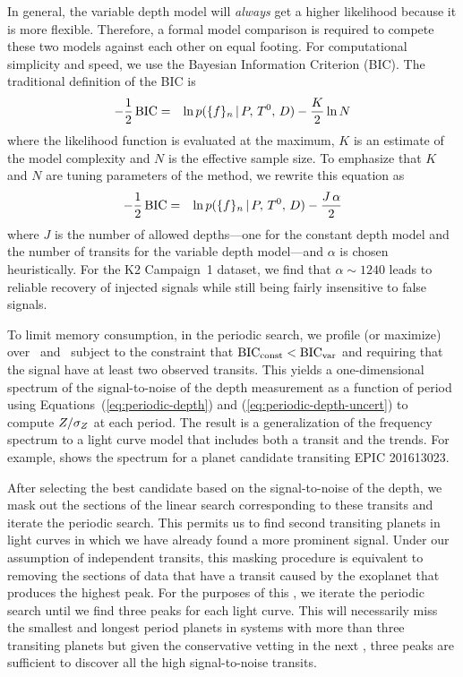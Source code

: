In general, the variable depth model will \emph{always} get a higher
likelihood because it is more flexible.
Therefore, a formal model comparison is required to compete these two models
against each other on equal footing.
For computational simplicity and speed, we use the Bayesian Information
Criterion (BIC).
The traditional definition of the BIC is
\begin{eqnarray}
-\frac{1}{2}\,{\mathrm{BIC}} &=&
    \ln p(\{{f}\}_n\,|\,{P},\,{T^0},\,{D})
    - \frac{K}{2} \ln N
\end{eqnarray}
where the likelihood function is evaluated at the maximum, $K$ is an estimate
of the model complexity and $N$ is the effective sample size.
To emphasize that $K$ and $N$ are tuning parameters of the method, we
rewrite this equation as
\begin{eqnarray}
-\frac{1}{2}\,{\mathrm{BIC}} &=&
    \ln p(\{{f}\}_n\,|\,{P},\,{T^0},\,{D}) -
        \frac{J\,\alpha}{2}
\end{eqnarray}
where $J$ is the number of allowed depths---one for the constant depth model
and the number of transits for the variable depth model---and $\alpha$ is
chosen heuristically.
For the K2 Campaign~1 dataset, we find that $\alpha \sim 1240$ leads to
reliable recovery of injected signals while still being fairly insensitive to
false signals.

To limit memory consumption, in the periodic search, we profile (or maximize)
over \phase\ and \duration\ subject to the constraint that
${\mathrm{BIC}}_\mathrm{const} < {\mathrm{BIC}}_\mathrm{var}$ and requiring that the signal have
at least two observed transits.
This yields a one-dimensional spectrum of the signal-to-noise of the depth
measurement as a function of period using Equations~(\ref{eq:periodic-depth})
and (\ref{eq:periodic-depth-uncert}) to compute ${Z}/\sigma_{Z}$ at
each period.
The result is a generalization of the  frequency spectrum
\citep{Kovacs:2002} to a light curve model that includes both a transit and
the trends.
For example,  shows the spectrum for a planet candidate
transiting EPIC 201613023.

After selecting the best candidate based on the signal-to-noise of the depth,
we mask out the sections of the linear search corresponding to these transits
and iterate the periodic search.
This permits us to find second transiting planets in light curves in which
we have already found a more prominent signal.
Under our assumption of independent transits, this masking procedure is
equivalent to removing the sections of data that have a transit caused by the
exoplanet that produces the highest peak.
For the purposes of this \paper, we iterate the periodic search until we find
three peaks for each light curve.
This will necessarily miss the smallest and longest period planets in systems
with more than three transiting planets but given the conservative vetting in
the next \sectionname, three peaks are sufficient to discover all the high
signal-to-noise transits.

